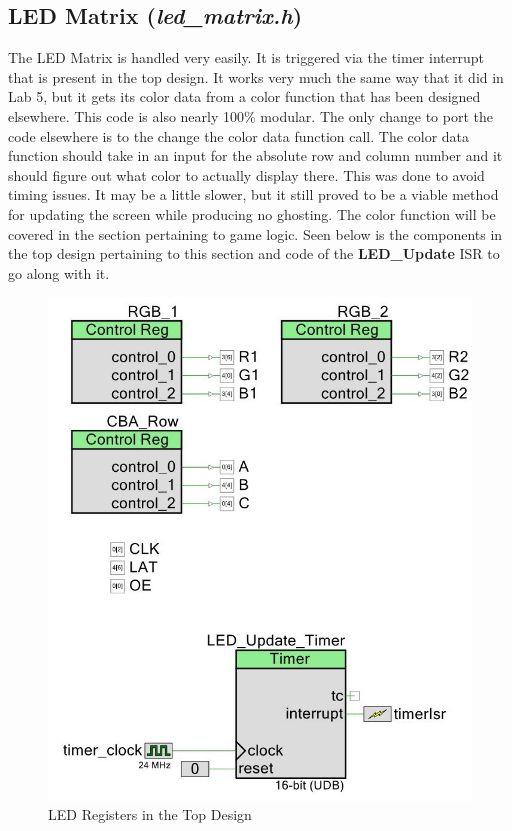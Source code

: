 \documentclass[a4paper, 12pt]{article}
\begin{document}
    
    \subsection{LED Matrix (\textit{led\_matrix.h})}

    The LED Matrix is handled very easily. It is triggered via the timer
    interrupt that is present in the top design. It works very much the same way
    that it did in Lab 5, but it gets its color data from a color function
    that has been designed elsewhere. This code is also nearly 100\% modular.
    The only change to port the code elsewhere is to the change the color
    data function call. The color data function should take in an input for the
    absolute row and column number and it should figure out what color to
    actually display there. This was done to avoid timing issues. It may be
    a little slower, but it still proved to be a viable method for updating
    the screen while producing no ghosting. The color function will be
    covered in the section pertaining to game logic. Seen below is the components
    in the top design pertaining to this section and code of the 
    \textbf{LED\_Update} ISR to go along with it.

    \begin{figure}[H]
        \centering
        \includegraphics[scale=0.6]{pics/led_matrix}
        \caption{LED Registers in the Top Design}
        \label{fig:TopDesign}
    \end{figure}
\end{document}
